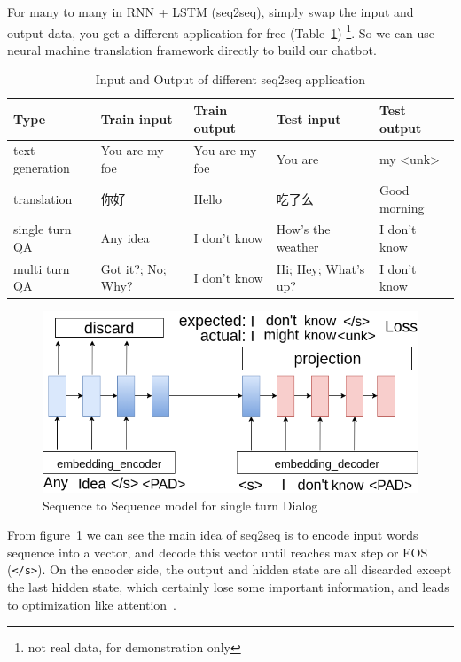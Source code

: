 \documentclass{article}
\begin{document}
For many to many in RNN + LSTM (seq2seq), simply swap the input and output data, you get a different application for free
(Table~\ref{table:seq2seq-app}) \footnote{not real data, for demonstration only}.
So we can use neural machine translation framework directly to build our chatbot.

\begin{table}[h]
    \caption{Input and Output of different seq2seq application}
    \label{table:seq2seq-app}
    \centering
    \begin{tabular}{lllll}
        \toprule
        Type & Train input & Train output & Test input & Test output \\
        \midrule
        text generation & You are my foe & You are my foe & You are & my <unk>\\
        translation & {\cjkfont 你好} & Hello & {\cjkfont 吃了么} & Good morning \\
        single turn QA & Any idea & I don't know & How's the weather & I don't know \\
        multi turn QA & Got it?; No; Why? & I don't know & Hi; Hey; What's up? & I don't know \\
        \bottomrule
    \end{tabular}
\end{table}

\begin{figure}[h]
    \centering
    \includegraphics[width=\columnwidth]{seq2seq-simple}
    \caption{Sequence to Sequence model for single turn Dialog}
    \label{fig:seq2seq}
\end{figure}

From figure~\ref{fig:seq2seq} we can see the main idea of seq2seq is to encode input words sequence into a vector,
and decode this vector until reaches max step or EOS (\verb+</s>+).
On the encoder side, the output and hidden state are all discarded except the last hidden state,
which certainly lose some important information, and leads to optimization like attention~\cite{luong2015effective}.
\end{document}
